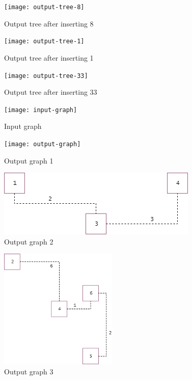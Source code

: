 \documentclass {article}
\begin{document}
\begin{figure}[H]
\texttt{[image: output-tree-8]}

\caption{Output tree after inserting 8}
\label{fig:output-tree-8}
\end{figure}

\begin{figure}[H]
\texttt{[image: output-tree-1]}

\caption{Output tree after inserting 1}
\label{fig:output-tree-1}
\end{figure}

\begin{figure}[H]
\texttt{[image: output-tree-33]}

\caption{Output tree after inserting 33}
\label{fig:output-tree-33}
\end{figure}

\begin{figure}[H]
\texttt{[image: input-graph]}

\caption{Input graph}
\label{fig:input-graph}
\end{figure}

\begin{figure}[H]
\texttt{[image: output-graph]}

\caption{Output graph 1}
\label{fig:output-graph}
\end{figure}

\begin{figure}[H]
\includegraphics[width=\textwidth]{output-graph2}

\caption{Output graph 2}
\label{fig:output-graph2}
\end{figure}

\begin{figure}[H]
\centering
\includegraphics[width=0.5\textwidth]{output-graph3}

\caption{Output graph 3}
\label{fig:output-graph3}
\end{figure}
\end{document}
